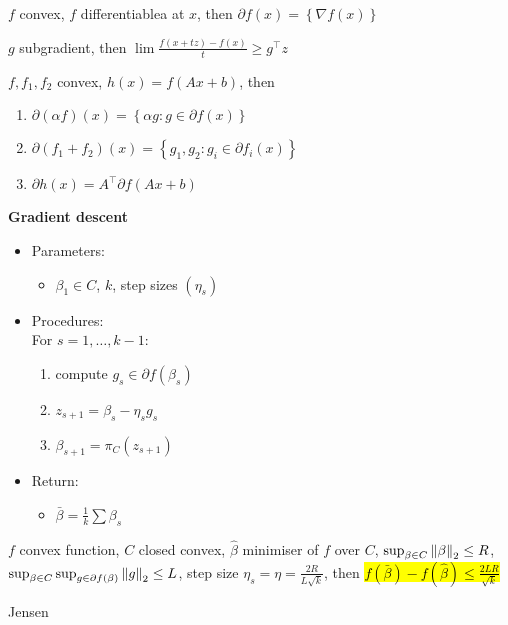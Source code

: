 \begin{prop}
    $f$ convex, $f$ differentiablea at $x$, then $\partial f(x) = \left\{ \nabla f(x) \right\}$
\end{prop}
\begin{pf}
    $g$ subgradient, then $\lim \frac{f( x + tz ) - f(x)}{t} \geq g^\top z$
\end{pf}

\begin{prop}
    $f, f_1, f_2$ convex, $h(x) = f(Ax + b)$, then
    \begin{enumerate}
        \item $\partial(\alpha f)(x) = \left\{ \alpha g : g \in \partial f(x) \right\}$
        \item $\partial(f_1 + f_2)(x) = \left\{ g_1, g_2 : g_i \in \partial f_i(x) \right\}$
        \item $\partial h(x) = A^\top \partial f(Ax + b)$
    \end{enumerate}
\end{prop}

\textbf{Gradient descent}
\begin{itemize}
    \item Parameters:
    \begin{itemize}
        \item $\beta_1 \in C$, $k$, step sizes $(\eta_s)$
    \end{itemize}
    \item Procedures:\\
    For $s = 1, \dots, k - 1$:
    \begin{enumerate}
        \item compute $g_s \in \partial f(\beta_s)$
        \item $z_{s+1} = \beta_s - \eta_s g_s$
        \item $\beta_{s+1} = \pi_C(z_{s+1})$
    \end{enumerate}
    \item Return:
    \begin{itemize}
        \item $\bar \beta = \frac{1}{k} \sum \beta_s$
    \end{itemize}
\end{itemize}

\begin{thm}
    $f$ convex function, $C$ closed convex, $\hat \beta$ minimiser of $f$ over $C$, $\sup_{\beta \in C} \left\lVert\beta\right\rVert_2 \leq R$,
    $\sup_{\beta \in C}\sup_{g \in \partial f(\beta)} \left\lVert g\right\rVert_2 \leq L$, step size $\eta_s = \eta = \frac{2R}{L\sqrt{k}}$,
    then \hl{$f(\bar \beta) - f(\hat \beta) \leq \frac{2LR}{\sqrt{k}}$}
\end{thm}
\begin{pf}
    Jensen
\end{pf}

